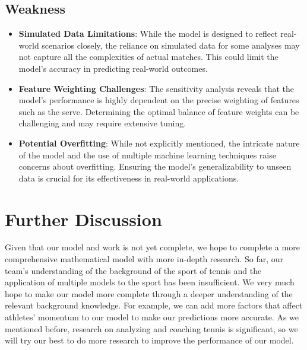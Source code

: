 \documentclass{mcmthesis}
\begin{document}
\subsection{Weakness}

\begin{itemize}
    \item[] {\bf Simulated Data Limitations}: While the model is designed to reflect real-world scenarios closely, the reliance on simulated data for some analyses may not capture all the complexities of actual matches. This could limit the model's accuracy in predicting real-world outcomes.

    \item[] {\bf Feature Weighting Challenges}: The sensitivity analysis reveals that the model's performance is highly dependent on the precise weighting of features such as the serve. Determining the optimal balance of feature weights can be challenging and may require extensive tuning.

    \item[] {\bf Potential Overfitting}:  While not explicitly mentioned, the intricate nature of the model and the use of multiple machine learning techniques raise concerns about overfitting. Ensuring the model's generalizability to unseen data is crucial for its effectiveness in real-world applications.

\end{itemize}

\section{Further Discussion}

Given that our model and work is not yet complete, we hope to complete a more comprehensive mathematical model with more in-depth research. So far, our team's understanding of the background of the sport of tennis and the application of multiple models to the sport has been insufficient. We very much hope to make our model more complete through a deeper understanding of the relevant background knowledge. For example, we can add more factors that affect athletes' momentum to our model to make our predictions more accurate. As we mentioned before, research on analyzing and coaching tennis is significant, so we will try our best to do more research to improve the performance of our model.
\end{document}
